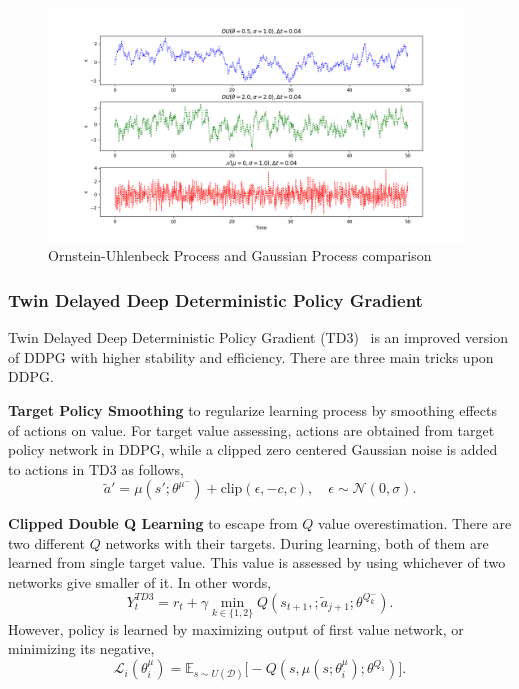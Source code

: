 \begin{figure}
	\centering
	\includegraphics[width=0.98\textwidth]{figures/others/random_processes.png}
	\caption{Ornstein-Uhlenbeck Process and Gaussian Process comparison}
	\label{fig:ou_vs_gaussian}
\end{figure}

\subsubsection{Twin Delayed Deep Deterministic Policy Gradient}
Twin Delayed Deep Deterministic Policy Gradient (TD3)~\cite{fujimoto_addressing_2018} is an improved version of DDPG with higher stability and efficiency. 
There are three main tricks upon DDPG. 

\textbf{Target Policy Smoothing} to regularize learning process by smoothing effects of actions on value. For target value assessing, actions are obtained from target policy network in DDPG, while a clipped zero centered Gaussian noise is added to actions in TD3 as follows,
\begin{equation}
\label{eqn:td3_target_action}
\widetilde{a}' = \mu(s';\theta^{\mu^-}) + \text{clip}(\epsilon, -c, c), \quad \epsilon \sim \mathcal{N}(0, \sigma).
\end{equation}

\textbf{Clipped Double Q Learning} to escape from $Q$ value overestimation. 
There are two different $Q$ networks with their targets. 
During learning, both of them are learned from single target value. 
This value is assessed by using whichever of two networks give smaller of it. In other words, 
\begin{equation}
\label{eqn:td3_target}
Y_t^{TD3} = r_t + \gamma \min_{k\in\{1,2\}} Q(s_{t+1}, ;\widetilde{a}_{j+1};\theta^{Q_k^-}).
\end{equation}
However, policy is learned by maximizing output of first value network, or minimizing its negative,
\begin{equation}
\label{eqn:td3_policy_loss}
\mathcal{L}_i(\theta^\mu_i) = \mathbb{E}_{s \sim U(\mathcal{D})} \Big[ -Q(s, \mu(s;\theta^\mu_i);\theta^{Q_1}) \Big].
\end{equation} 


